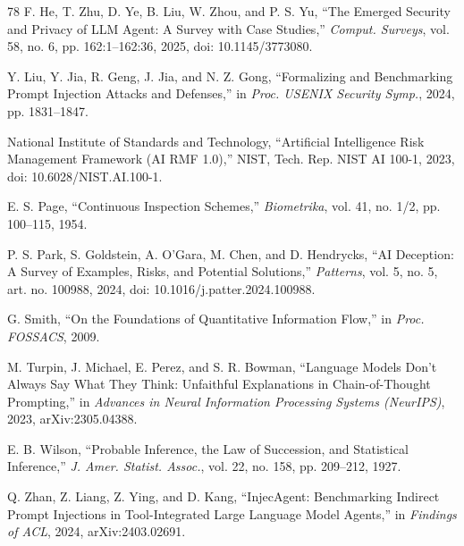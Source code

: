 \begin{thebibliography}{78}
F. He, T. Zhu, D. Ye, B. Liu, W. Zhou, and P. S. Yu, ``The Emerged Security
and Privacy of LLM Agent: A Survey with Case Studies,'' \emph{Comput.
Surveys}, vol. 58, no. 6, pp. 162:1--162:36, 2025, doi: 10.1145/3773080.

Y. Liu, Y. Jia, R. Geng, J. Jia, and N. Z. Gong, ``Formalizing and
Benchmarking Prompt Injection Attacks and Defenses,'' in \emph{Proc. USENIX
Security Symp.}, 2024, pp. 1831--1847.

National Institute of Standards and Technology, ``Artificial Intelligence
Risk Management Framework (AI RMF 1.0),'' NIST, Tech. Rep. NIST AI 100-1,
2023, doi: 10.6028/NIST.AI.100-1.

E. S. Page, ``Continuous Inspection Schemes,'' \emph{Biometrika}, vol. 41,
no. 1/2, pp. 100--115, 1954.

P. S. Park, S. Goldstein, A. O'Gara, M. Chen, and D. Hendrycks, ``AI
Deception: A Survey of Examples, Risks, and Potential Solutions,''
\emph{Patterns}, vol. 5, no. 5, art. no. 100988, 2024, doi:
10.1016/j.patter.2024.100988.

G. Smith, ``On the Foundations of Quantitative Information Flow,'' in
\emph{Proc. FOSSACS}, 2009.

M. Turpin, J. Michael, E. Perez, and S. R. Bowman, ``Language Models Don't
Always Say What They Think: Unfaithful Explanations in Chain-of-Thought
Prompting,'' in \emph{Advances in Neural Information Processing Systems
(NeurIPS)}, 2023, arXiv:2305.04388.

E. B. Wilson, ``Probable Inference, the Law of Succession, and Statistical
Inference,'' \emph{J. Amer. Statist. Assoc.}, vol. 22, no. 158, pp. 209--212,
1927.

Q. Zhan, Z. Liang, Z. Ying, and D. Kang, ``InjecAgent: Benchmarking Indirect
Prompt Injections in Tool-Integrated Large Language Model Agents,'' in
\emph{Findings of ACL}, 2024, arXiv:2403.02691.

\end{thebibliography}
